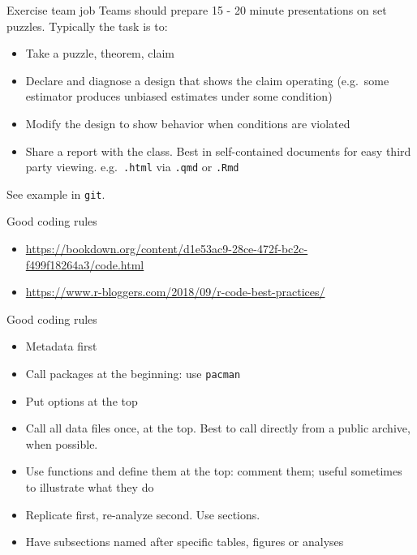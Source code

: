 \documentclass[
  11pt,
  ignorenonframetext,
]{beamer}
\providecommand{\tightlist}{%
  \setlength{\itemsep}{0pt}\setlength{\parskip}{0pt}}\usepackage{longtable,booktabs,array}
\begin{document}
\begin{frame}[fragile]{Exercise team job}
\protect\hypertarget{exercise-team-job}{}
Teams should prepare 15 - 20 minute presentations on set puzzles.
Typically the task is to:

\begin{itemize}
\item
  Take a puzzle, theorem, claim
\item
  Declare and diagnose a design that shows the claim operating
  (e.g.~some estimator produces unbiased estimates under some condition)
\item
  Modify the design to show behavior when conditions are violated
\item
  Share a report with the class. Best in self-contained documents for
  easy third party viewing. e.g.~\texttt{.html} via \texttt{.qmd} or
  \texttt{.Rmd}
\end{itemize}

See example in \texttt{git}.
\end{frame}

\begin{frame}{Good coding rules}
\protect\hypertarget{good-coding-rules}{}
\begin{itemize}
\tightlist
\item
  \url{https://bookdown.org/content/d1e53ac9-28ce-472f-bc2c-f499f18264a3/code.html}
\item
  \url{https://www.r-bloggers.com/2018/09/r-code-best-practices/}
\end{itemize}
\end{frame}

\begin{frame}[fragile]{Good coding rules}
\protect\hypertarget{good-coding-rules-1}{}
\begin{itemize}
\tightlist
\item
  Metadata first
\item
  Call packages at the beginning: use \texttt{pacman}
\item
  Put options at the top
\item
  Call all data files once, at the top. Best to call directly from a
  public archive, when possible.\\
\item
  Use functions and define them at the top: comment them; useful
  sometimes to illustrate what they do
\item
  Replicate first, re-analyze second. Use sections.
\item
  Have subsections named after specific tables, figures or analyses
\end{itemize}
\end{frame}
\end{document}
